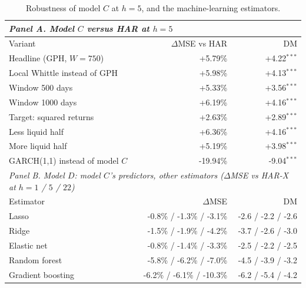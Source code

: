 \begin{table}[H]
\caption{Robustness of model $C$ at $h=5$, and the machine-learning estimators.}
\label{tab:robust}
\footnotesize
\begin{tabularx}{\textwidth}{Xrr}
\toprule
\multicolumn{3}{l}{\textit{Panel A. Model $C$ versus HAR at $h=5$}} \\
\midrule
Variant & $\Delta$MSE vs HAR & DM \\
\midrule
Headline (GPH, $W=750$) & +5.79\% & +4.22$^{***}$ \\
Local Whittle instead of GPH & +5.98\% & +4.13$^{***}$ \\
Window 500 days & +5.33\% & +3.56$^{***}$ \\
Window 1000 days & +6.19\% & +4.16$^{***}$ \\
Target: squared returns & +2.63\% & +2.89$^{***}$ \\
Less liquid half & +6.36\% & +4.16$^{***}$ \\
More liquid half & +5.19\% & +3.98$^{***}$ \\
GARCH(1,1) instead of model $C$ & -19.94\% & -9.04$^{***}$ \\
\midrule
\multicolumn{3}{l}{\textit{Panel B. Model $D$: model $C$'s predictors, other estimators ($\Delta$MSE vs HAR-X at $h=1$ / $5$ / $22$)}} \\
\midrule
Estimator & $\Delta$MSE & DM \\
\midrule
Lasso & -0.8\% / -1.3\% / -3.1\% & -2.6 / -2.2 / -2.6 \\
Ridge & -1.5\% / -1.9\% / -4.2\% & -3.7 / -2.6 / -3.0 \\
Elastic net & -0.8\% / -1.4\% / -3.3\% & -2.5 / -2.2 / -2.5 \\
Random forest & -5.8\% / -6.2\% / -7.0\% & -4.5 / -3.9 / -3.2 \\
Gradient boosting & -6.2\% / -6.1\% / -10.3\% & -6.2 / -5.4 / -4.2 \\
\bottomrule
\end{tabularx}
\end{table}
